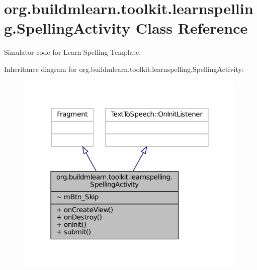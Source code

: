 \hypertarget{classorg_1_1buildmlearn_1_1toolkit_1_1learnspelling_1_1SpellingActivity}{\section{org.\-buildmlearn.\-toolkit.\-learnspelling.\-Spelling\-Activity Class Reference}
\label{classorg_1_1buildmlearn_1_1toolkit_1_1learnspelling_1_1SpellingActivity}
}


Simulator code for Learn Spelling Template.  




Inheritance diagram for org.\-buildmlearn.\-toolkit.\-learnspelling.\-Spelling\-Activity\-:
\nopagebreak
\begin{figure}[H]
\begin{center}
\leavevmode
\includegraphics[width=314pt]{db/d2d/classorg_1_1buildmlearn_1_1toolkit_1_1learnspelling_1_1SpellingActivity__inherit__graph}
\end{center}
\end{figure}



